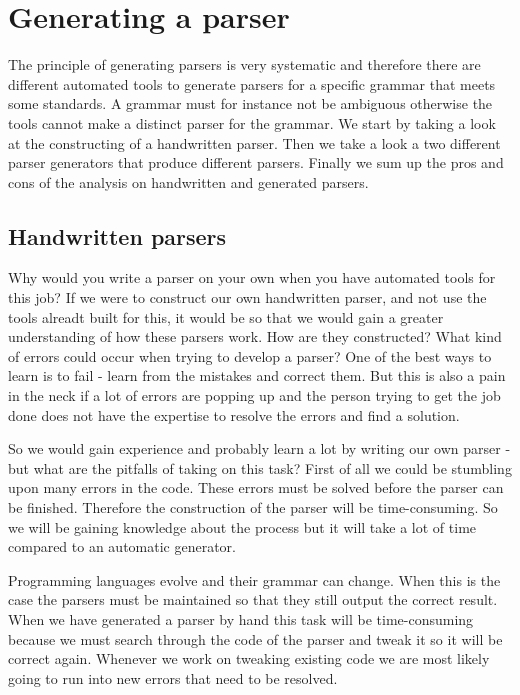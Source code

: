 \section{Generating a parser}
\label{sec:ana-parsers}
The principle of generating parsers is very systematic and therefore there are different automated tools to generate parsers for a specific grammar that meets some standards. A grammar must for instance not be ambiguous otherwise the tools cannot make a distinct parser for the grammar. We start by taking a look at the constructing of a handwritten parser. Then we take a look a two different parser generators that produce different parsers. Finally we sum up the pros and cons of the analysis on handwritten and generated parsers.

\subsection{Handwritten parsers}
\label{sec:handparser}
Why would you write a parser on your own when you have automated tools for this job? If we were to construct our own handwritten parser, and not use the tools alreadt built for this, it would be so that we would gain a greater understanding of how these parsers work. How are they constructed? What kind of errors could occur when trying to develop a parser? One of the best ways to learn is to fail - learn from the mistakes and correct them. But this is also a pain in the neck if a lot of errors are popping up and the person trying to get the job done does not have the expertise to resolve the errors and find a solution.

So we would gain experience and probably learn a lot by writing our own parser - but what are the pitfalls of taking on this task? First of all we could be stumbling upon many errors in the code. These errors must be solved before the parser can be finished. Therefore the construction of the parser will be time-consuming. So we will be gaining knowledge about the process but it will take a lot of time compared to an automatic generator.

Programming languages evolve and their grammar can change. When this is the case the parsers must be maintained so that they still output the correct result. When we have generated a parser by hand this task will be time-consuming because we must search through the code of the parser and tweak it so it will be correct again. Whenever we work on tweaking existing code we are most likely going to run into new errors that need to be resolved. 

